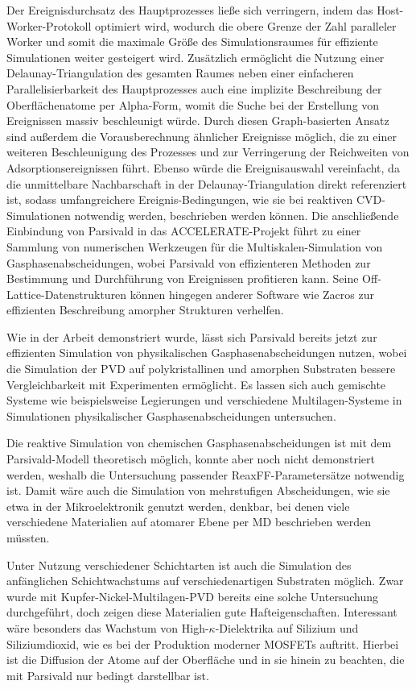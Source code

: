 Der Ereignisdurchsatz des Hauptprozesses ließe sich verringern, indem das Host-Worker-Protokoll optimiert wird, wodurch die obere Grenze der Zahl paralleler Worker und somit die maximale Größe des Simulationsraumes für effiziente Simulationen weiter gesteigert wird.
Zusätzlich ermöglicht die Nutzung einer Delaunay-Triangulation des gesamten Raumes neben einer einfacheren Parallelisierbarkeit des Hauptprozesses auch eine implizite Beschreibung der Oberflächenatome per Alpha-Form, womit die Suche bei der Erstellung von Ereignissen massiv beschleunigt würde.
Durch diesen Graph-basierten Ansatz sind außerdem die Vorausberechnung ähnlicher Ereignisse möglich, die zu einer weiteren Beschleunigung des Prozesses und zur Verringerung der Reichweiten von Adsorptionsereignissen führt.
Ebenso würde die Ereignisauswahl vereinfacht, da die unmittelbare Nachbarschaft in der Delaunay-Triangulation direkt referenziert ist, sodass umfangreichere Ereignis-Bedingungen, wie sie bei reaktiven CVD-Simulationen notwendig werden, beschrieben werden können.
Die anschließende Einbindung von Parsivald in das ACCELERATE-Projekt führt zu einer Sammlung von numerischen Werkzeugen für die Multiskalen-Simulation von Gasphasenabscheidungen, wobei Parsivald von effizienteren Methoden zur Bestimmung und Durchführung von Ereignissen profitieren kann.
Seine Off-Lattice-Datenstrukturen können hingegen anderer Software wie Zacros\cite{stamatakis_zacros_2014} zur effizienten Beschreibung amorpher Strukturen verhelfen.

Wie in der Arbeit demonstriert wurde, lässt sich Parsivald bereits jetzt zur effizienten Simulation von physikalischen Gasphasenabscheidungen nutzen, wobei die Simulation der PVD auf polykristallinen und amorphen Substraten bessere Vergleichbarkeit mit Experimenten ermöglicht\cite{adamov_electrical_1974}.
Es lassen sich auch gemischte Systeme wie beispielsweise Legierungen und verschiedene Multilagen-Systeme in Simulationen physikalischer Gasphasenabscheidungen untersuchen.

Die reaktive Simulation von chemischen Gasphasenabscheidungen ist mit dem Parsivald-Modell theoretisch möglich, konnte aber noch nicht demonstriert werden, weshalb die Untersuchung passender ReaxFF-Parametersätze notwendig ist.
Damit wäre auch die Simulation von mehrstufigen Abscheidungen, wie sie etwa in der Mikroelektronik genutzt werden\cite{granneman_thin_1993}, denkbar, bei denen viele verschiedene Materialien auf atomarer Ebene per MD beschrieben werden müssten.

Unter Nutzung verschiedener Schichtarten ist auch die Simulation des anfänglichen Schichtwachstums auf verschiedenartigen Substraten möglich.
Zwar wurde mit Kupfer-Nickel-Multi\-lagen-PVD bereits eine solche Untersuchung durchgeführt, doch zeigen diese Materialien gute Hafteigenschaften.
Interessant wäre besonders das Wachstum von High-$\kappa$-Dielektrika auf Silizium und Siliziumdioxid, wie es bei der Produktion moderner MOSFETs auftritt.
Hierbei ist die Diffusion der Atome auf der Oberfläche und in sie hinein zu beachten, die mit Parsivald nur bedingt darstellbar ist.
